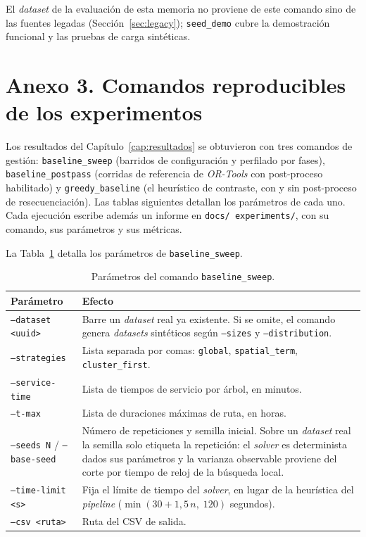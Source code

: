 El \textit{dataset} de la evaluación de esta memoria no proviene de este comando sino
de las fuentes legadas (Sección~\ref{sec:legacy}); \texttt{seed\_demo} cubre la
demostración funcional y las pruebas de carga sintéticas.

\section*{Anexo 3. Comandos reproducibles de los experimentos}

Los resultados del Capítulo~\ref{cap:resultados} se obtuvieron con tres comandos de
gestión: \texttt{baseline\_sweep} (barridos de configuración y perfilado por fases),
\texttt{baseline\_postpass} (corridas de referencia de \textit{OR-Tools} con
post-proceso habilitado) y \texttt{greedy\_baseline} (el heurístico de contraste, con
y sin post-proceso de resecuenciación). Las tablas siguientes detallan los parámetros
de cada uno. Cada ejecución escribe además un informe en \texttt{docs\slash
experiments\slash }, con su comando, sus parámetros y sus métricas.

La Tabla~\ref{tab:anexo_baseline_sweep} detalla los parámetros de \texttt{baseline\_sweep}.

\begin{table}[H]
  \centering
  \caption{Parámetros del comando \texttt{baseline\_sweep}.}
  \label{tab:anexo_baseline_sweep}
  \small
  \begin{tabularx}{\textwidth}{@{}p{5.5cm} X@{}}
    \toprule
    Parámetro & Efecto \\
    \midrule
    \texttt{--dataset <uuid>}       & Barre un \textit{dataset} real ya existente. Si se omite, el comando genera \textit{datasets} sintéticos según \texttt{--sizes} y \texttt{--distribution}. \\
    \texttt{--strategies}           & Lista separada por comas: \texttt{global}, \texttt{spatial\_term}, \texttt{cluster\_first}. \\
    \texttt{--service-time}         & Lista de tiempos de servicio por árbol, en minutos. \\
    \texttt{--t-max}                & Lista de duraciones máximas de ruta, en horas. \\
    \texttt{--seeds N} / \texttt{--base-seed} & Número de repeticiones y semilla inicial. Sobre un \textit{dataset} real la semilla solo etiqueta la repetición: el \textit{solver} es determinista dados sus parámetros y la varianza observable proviene del corte por tiempo de reloj de la búsqueda local. \\
    \texttt{--time-limit <s>}       & Fija el límite de tiempo del \textit{solver}, en lugar de la heurística del \textit{pipeline} ($\min(30 + 1{,}5\,n,\;120)$ segundos). \\
    \texttt{--csv <ruta>}           & Ruta del CSV de salida. \\
    \bottomrule
  \end{tabularx}
\end{table}

